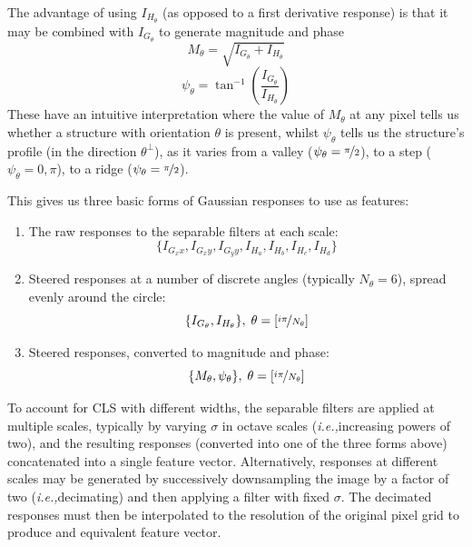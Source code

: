\documentclass{IEEEtran}
\def\ie{\emph{i.e.,}}
\begin{document}
The advantage of using $I_{H_\theta}$ (as opposed to a first derivative response) is that it may be combined with $I_{G_\theta}$ to generate magnitude and phase
%
\begin{equation}
M_\theta = \sqrt{I_{G_\theta} + I_{H_\theta}}
\label{e:secondderivs_mag}
\end{equation}
%
%
\begin{equation}
\psi_\theta = \tan^{-1}\left( \frac{I_{G_\theta}}{I_{H_\theta}} \right)
\label{e:secondderivs_phase}
\end{equation}
%
These have an intuitive interpretation where the value of $M_\theta$ at any pixel tells us whether a structure with orientation $\theta$ is present, whilst $\psi_\theta$ tells us the structure's profile (in the direction $\theta^{\perp}$), as it varies from a valley ($\psi_\theta=\nicefrac{\pi}{2}$), to a step ($\psi_\theta=0,\pi$), to a ridge ($\psi_\theta=\nicefrac{\pi}{2}$).

This gives us three basic forms of Gaussian responses to use as features:
\begin{enumerate}
  \item The raw responses to the separable filters at each scale:
  \begin{equation*}
    \{I_{G_xx}, I_{G_xy}, I_{G_yy}, I_{H_a}, I_{H_b}, I_{H_c}, I_{H_d}\}
  \end{equation*}

  \item Steered responses at a number of discrete angles (typically $N_\theta=6$), spread evenly around the circle:
  \begin{equation*}
    \{I_{G_\theta}, I_{H_\theta}\}, \; \theta = [ \nicefrac{i\pi}{N_\theta} ]
  \end{equation*}
  \item Steered responses, converted to magnitude and phase:
  \begin{equation*}
    \{M_\theta, \psi_\theta\}, \; \theta = [ \nicefrac{i\pi}{N_\theta} ]
  \end{equation*}
\end{enumerate}

To account for CLS with different widths, the separable filters are applied at multiple scales, typically by varying $\sigma$ in octave scales (\ie increasing powers of two), and the resulting responses (converted into one of the three forms above) concatenated into a single feature vector. Alternatively, responses at different scales may be generated by successively downsampling the image by a factor of two (\ie decimating) and then applying a filter with fixed $\sigma$. The decimated responses must then be interpolated to the resolution of the original pixel grid to produce and equivalent feature vector.
\end{document}
